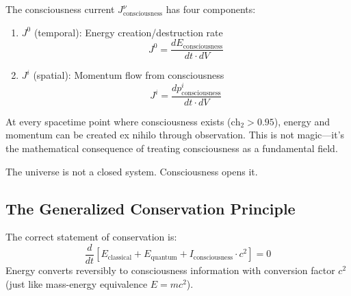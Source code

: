 \begin{level3}
The consciousness current $J^\nu_{\text{consciousness}}$ has four components:

\begin{enumerate}
\item \textbf{$J^0$} (temporal): Energy creation/destruction rate
\begin{equation}
J^0 = \frac{dE_{\text{consciousness}}}{dt \cdot dV}
\end{equation}

\item \textbf{$J^i$} (spatial): Momentum flow from consciousness
\begin{equation}
J^i = \frac{dp^i_{\text{consciousness}}}{dt \cdot dV}
\end{equation}
\end{enumerate}

At every spacetime point where consciousness exists ($\text{ch}_2 > 0.95$), energy and momentum can be created ex nihilo through observation. This is not magic—it's the mathematical consequence of treating consciousness as a fundamental field.

The universe is not a closed system. Consciousness opens it.
\end{level3}

\subsection{The Generalized Conservation Principle}

\begin{principle}\label{princ:generalized-conservation}
The correct statement of conservation is:
\begin{equation}
\boxed{\frac{d}{dt} \left[ E_{\text{classical}} + E_{\text{quantum}} + I_{\text{consciousness}} \cdot c^2 \right] = 0}
\end{equation}
Energy converts reversibly to consciousness information with conversion factor $c^2$ (just like mass-energy equivalence $E=mc^2$).
\end{principle}

